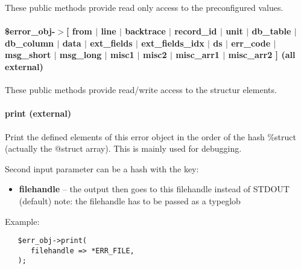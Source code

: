 These public methods provide read only access to the preconfigured values.

\paragraph*{\$error\_obj-$>$[ from $|$ line $|$ backtrace $|$ record\_id $|$ unit
            $|$ db\_table $|$ db\_column $|$ data $|$ ext\_fields $|$ ext\_fields\_idx
            $|$ ds $|$ err\_code $|$ msg\_short $|$ msg\_long $|$ misc1 $|$ misc2
            $|$ misc\_arr1 $|$ misc\_arr2 ] (all external)\label{Apiis::Errors_--_Provide_error_objects_for_generic_error_handling_in_APIIS__error_obj-_from_line_backtrace_record_id_unit_db_table_db_column_data_ext_fields_ext_fields_idx_ds_err_code_msg_short_msg_long_misc1_misc2_misc_arr1_misc_arr2_all_external_}}


These public methods provide read/write access to the structur elements.

\paragraph*{print (external)\label{Apiis::Errors_--_Provide_error_objects_for_generic_error_handling_in_APIIS_print_external_}}


Print the defined elements of this error object in the order of the
hash \%struct (actually the @struct array). This is mainly used for debugging.



Second input parameter can be a hash with the key:

\begin{itemize}

\item \textbf{filehandle} -- the output then goes to this filehandle instead of
        STDOUT (default)
        note: the filehandle has to be passed as a typeglob\end{itemize}


Example:

\begin{verbatim}
   $err_obj->print(
      filehandle => *ERR_FILE,
   );
\end{verbatim}
